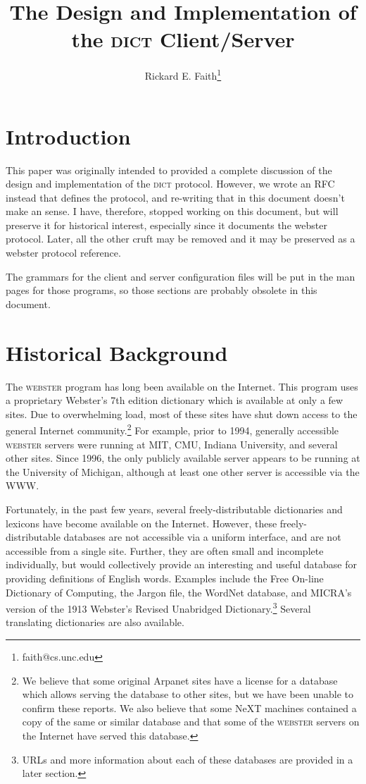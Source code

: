 \documentclass{article}
\newcommand{\dict}{\textsc{dict}\xspace}
\newcommand{\webster}{\textsc{webster}\xspace}
\begin{document}
\title{The Design and Implementation of the \dict Client/Server}
\author{Rickard E. Faith\thanks{faith@cs.unc.edu}}
\maketitle


\section{Introduction}

This paper was originally intended to provided a complete discussion of the
design and implementation of the \dict protocol.  However, we wrote an RFC
instead that defines the protocol, and re-writing that in this document
doesn't make an sense.  I have, therefore, stopped working on this
document, but will preserve it for historical interest, especially since it
documents the webster protocol.  Later, all the other cruft may be removed
and it may be preserved as a webster protocol reference.

The grammars for the client and server configuration files will be put in
the man pages for those programs, so those sections are probably obsolete
in this document.

\section{Historical Background}

The \webster program has long been available on the Internet.  This program
uses a proprietary Webster's 7th edition dictionary which is available at
only a few sites.  Due to overwhelming load, most of these sites have shut
down access to the general Internet community.\footnote{We believe that
  some original Arpanet sites have a license for a database which allows
  serving the database to other sites, but we have been unable to confirm
  these reports.  We also believe that some NeXT machines contained a copy
  of the same or similar database and that some of the \webster servers on
  the Internet have served this database.} For example, prior to 1994,
generally accessible \webster servers were running at MIT, CMU, Indiana
University, and several other sites.  Since 1996, the only publicly
available server appears to be running at the University of Michigan,
although at least one other server is accessible via the WWW.

Fortunately, in the past few years, several freely-distributable
dictionaries and lexicons have become available on the Internet.  However,
these freely-distributable databases are not accessible via a uniform
interface, and are not accessible from a single site.  Further, they are
often small and incomplete individually, but would collectively provide an
interesting and useful database for providing definitions of English words.
Examples include the Free On-line Dictionary of Computing, the Jargon file,
the WordNet database, and MICRA's version of the 1913 Webster's Revised
Unabridged Dictionary.\footnote{URLs and more information about each of
  these databases are provided in a later section.} Several translating
dictionaries are also available.
\end{document}
